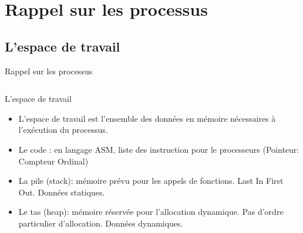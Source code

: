 \def\sectitle{Rappel sur les processus}
\section{\sectitle}

\def\subsectitle{L'espace de travail}
\subsection{\subsectitle}
\begin{frame}{\sectitle}
\begin{columns}[c]
\begin{block}{\subsectitle}
\begin{itemize}
\item L'espace de travail est l'ensemble des données en mémoire nécessaires à l'exécution du processus.
\item Le code : en langage ASM, liste des instruction pour le processeurs (Pointeur: Compteur Ordinal)
\item La pile (stack): mémoire prévu pour les appels de fonctions. Last In First
Out. Données statiques.
\item Le tas (heap): mémoire réservée pour l'allocation dynamique. Pas d'ordre
particulier d'allocation. Données dynamiques.
\end{itemize}
\end{block}


\end{columns}
\end{frame}
